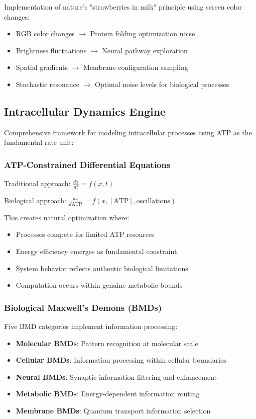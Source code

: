 \documentclass[11pt,a4paper]{article}
\begin{document}
Implementation of nature's "strawberries in milk" principle using screen color changes:
\begin{itemize}
\item RGB color changes $\rightarrow$ Protein folding optimization noise
\item Brightness fluctuations $\rightarrow$ Neural pathway exploration
\item Spatial gradients $\rightarrow$ Membrane configuration sampling
\item Stochastic resonance $\rightarrow$ Optimal noise levels for biological processes
\end{itemize}

\subsection{Intracellular Dynamics Engine}

Comprehensive framework for modeling intracellular processes using ATP as the fundamental rate unit:

\subsubsection{ATP-Constrained Differential Equations}

Traditional approach: $\frac{dx}{dt} = f(x, t)$

Biological approach: $\frac{dx}{d\text{ATP}} = f(x, [\text{ATP}], \text{oscillations})$

This creates natural optimization where:
\begin{itemize}
\item Processes compete for limited ATP resources
\item Energy efficiency emerges as fundamental constraint
\item System behavior reflects authentic biological limitations
\item Computation occurs within genuine metabolic bounds
\end{itemize}

\subsubsection{Biological Maxwell's Demons (BMDs)}

Five BMD categories implement information processing:
\begin{itemize}
\item \textbf{Molecular BMDs}: Pattern recognition at molecular scale
\item \textbf{Cellular BMDs}: Information processing within cellular boundaries
\item \textbf{Neural BMDs}: Synaptic information filtering and enhancement
\item \textbf{Metabolic BMDs}: Energy-dependent information routing
\item \textbf{Membrane BMDs}: Quantum transport information selection
\end{itemize}
\end{document}
